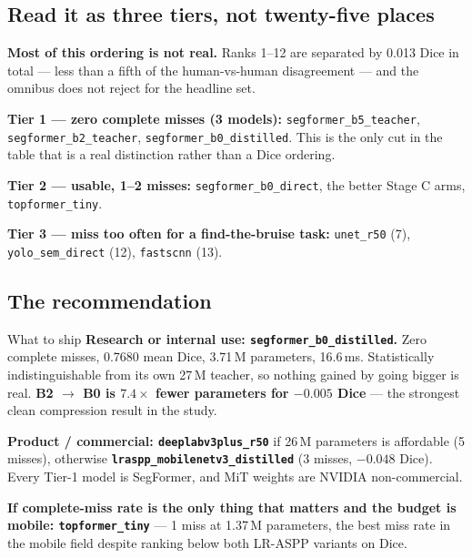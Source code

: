 \documentclass[11pt]{article}
\begin{document}
\subsection{Read it as three tiers, not twenty-five places}

\textbf{Most of this ordering is not real.} Ranks 1--12 are separated by 0.013
Dice in total --- less than a fifth of the human-vs-human disagreement --- and the
omnibus does not reject for the headline set.

\begin{sloppypar}
\textbf{Tier 1 --- zero complete misses (3 models):}
\texttt{segformer\_b5\_teacher}, \texttt{segformer\_b2\_teacher},
\texttt{segformer\_b0\_distilled}. This is the only cut in the table that is a
real distinction rather than a Dice ordering.

\textbf{Tier 2 --- usable, 1--2 misses:} \texttt{segformer\_b0\_direct}, the
better Stage C arms, \texttt{topformer\_tiny}.

\textbf{Tier 3 --- miss too often for a find-the-bruise task:}
\texttt{unet\_r50} (7), \texttt{yolo\_sem\_direct} (12), \texttt{fastscnn} (13).
\end{sloppypar}

\subsection{The recommendation}

\begin{keybox}{What to ship}
\textbf{Research or internal use: \texttt{segformer\_b0\_distilled}.} Zero
complete misses, 0.7680 mean Dice, 3.71\,M parameters, 16.6\,ms. Statistically
indistinguishable from its own 27\,M teacher, so nothing gained by going bigger is
real. \textbf{B2 $\rightarrow$ B0 is $7.4\times$ fewer parameters for $-0.005$
Dice} --- the strongest clean compression result in the study.

\textbf{Product / commercial: \texttt{deeplabv3plus\_r50}} if 26\,M parameters is
affordable (5 misses), otherwise \textbf{\texttt{lraspp\_mobilenetv3\_distilled}}
(3 misses, $-0.048$ Dice). Every Tier-1 model is SegFormer, and MiT weights are
NVIDIA non-commercial.

\textbf{If complete-miss rate is the only thing that matters and the budget is
mobile: \texttt{topformer\_tiny}} --- 1 miss at 1.37\,M parameters, the best
miss rate in the mobile field despite ranking below both LR-ASPP variants on Dice.
\end{keybox}
\end{document}
